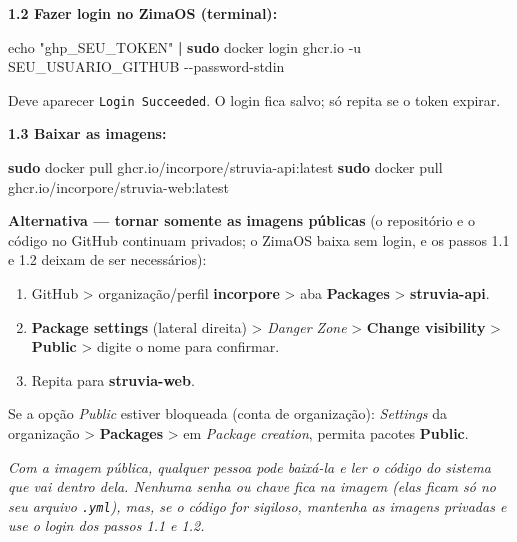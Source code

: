\documentclass[
  10pt,
]{article}
\newenvironment{Shaded}{\begin{snugshade}}{\end{snugshade}}
\newcommand{\AttributeTok}[1]{\textcolor[rgb]{0.13,0.29,0.53}{#1}}
\newcommand{\BuiltInTok}[1]{#1}
\newcommand{\FunctionTok}[1]{\textcolor[rgb]{0.13,0.29,0.53}{\textbf{#1}}}
\newcommand{\KeywordTok}[1]{\textcolor[rgb]{0.13,0.29,0.53}{\textbf{#1}}}
\newcommand{\NormalTok}[1]{#1}
\newcommand{\StringTok}[1]{\textcolor[rgb]{0.31,0.60,0.02}{#1}}
\providecommand{\tightlist}{%
  \setlength{\itemsep}{0pt}\setlength{\parskip}{0pt}}
\renewenvironment{quote}{\begin{oldquote}\small\itshape}{\end{oldquote}}
\begin{document}
\textbf{1.2 Fazer login no ZimaOS (terminal):}

\begin{Shaded}
\begin{Highlighting}[]
\BuiltInTok{echo} \StringTok{"ghp\_SEU\_TOKEN"} \KeywordTok{|} \FunctionTok{sudo}\NormalTok{ docker login ghcr.io }\AttributeTok{{-}u}\NormalTok{ SEU\_USUARIO\_GITHUB }\AttributeTok{{-}{-}password{-}stdin}
\end{Highlighting}
\end{Shaded}

Deve aparecer \texttt{Login\ Succeeded}. O login fica salvo; só repita
se o token expirar.

\textbf{1.3 Baixar as imagens:}

\begin{Shaded}
\begin{Highlighting}[]
\FunctionTok{sudo}\NormalTok{ docker pull ghcr.io/incorpore/struvia{-}api:latest}
\FunctionTok{sudo}\NormalTok{ docker pull ghcr.io/incorpore/struvia{-}web:latest}
\end{Highlighting}
\end{Shaded}

\textbf{Alternativa --- tornar somente as imagens públicas} (o
repositório e o código no GitHub continuam privados; o ZimaOS baixa sem
login, e os passos 1.1 e 1.2 deixam de ser necessários):

\begin{enumerate}
\def\labelenumi{\arabic{enumi}.}
\tightlist
\item
  GitHub \textgreater{} organização/perfil \textbf{incorpore}
  \textgreater{} aba \textbf{Packages} \textgreater{}
  \textbf{struvia-api}.
\item
  \textbf{Package settings} (lateral direita) \textgreater{}
  \emph{Danger Zone} \textgreater{} \textbf{Change visibility}
  \textgreater{} \textbf{Public} \textgreater{} digite o nome para
  confirmar.
\item
  Repita para \textbf{struvia-web}.
\end{enumerate}

Se a opção \emph{Public} estiver bloqueada (conta de organização):
\emph{Settings} da organização \textgreater{} \textbf{Packages}
\textgreater{} em \emph{Package creation}, permita pacotes
\textbf{Public}.

\begin{quote}
Com a imagem pública, qualquer pessoa pode baixá-la e ler o código do
sistema que vai dentro dela. Nenhuma senha ou chave fica na imagem (elas
ficam só no seu arquivo \texttt{.yml}), mas, se o código for sigiloso,
mantenha as imagens privadas e use o login dos passos 1.1 e 1.2.
\end{quote}
\end{document}
